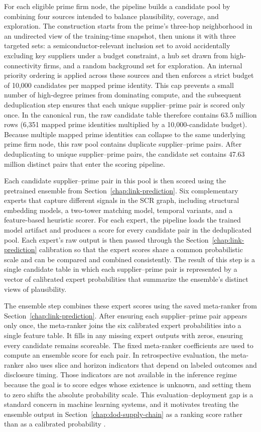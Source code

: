 For each eligible prime firm node, the pipeline builds a candidate pool by combining four sources intended to balance plausibility, coverage, and exploration. The construction starts from the prime's three-hop neighborhood in an undirected view of the training-time snapshot, then unions it with three targeted sets: a semiconductor-relevant inclusion set to avoid accidentally excluding key suppliers under a budget constraint, a hub set drawn from high-connectivity firms, and a random background set for exploration. An internal priority ordering is applied across these sources and then enforces a strict budget of 10{,}000 candidates per mapped prime identity. This cap prevents a small number of high-degree primes from dominating compute, and the subsequent deduplication step ensures that each unique supplier--prime pair is scored only once. In the canonical run, the raw candidate table therefore contains 63.5 million rows (6{,}351 mapped prime identities multiplied by a 10{,}000-candidate budget). Because multiple mapped prime identities can collapse to the same underlying prime firm node, this raw pool contains duplicate supplier--prime pairs. After deduplicating to unique supplier--prime pairs, the candidate set contains 47.63 million distinct pairs that enter the scoring pipeline.

Each candidate supplier--prime pair in this pool is then scored using the pretrained ensemble from Section~\ref{chap:link-prediction}. Six complementary experts that capture different signals in the SCR graph, including structural embedding models, a two-tower matching model, temporal variants, and a feature-based heuristic scorer. For each expert, the pipeline loads the trained model artifact and produces a score for every candidate pair in the deduplicated pool. Each expert's raw output is then passed through the Section~\ref{chap:link-prediction} calibration so that the expert scores share a common probabilistic scale and can be compared and combined consistently. The result of this step is a single candidate table in which each supplier--prime pair is represented by a vector of calibrated expert probabilities that summarize the ensemble's distinct views of plausibility.

The ensemble step combines these expert scores using the saved meta-ranker from Section~\ref{chap:link-prediction}. After ensuring each supplier--prime pair appears only once, the meta-ranker joins the six calibrated expert probabilities into a single feature table. It fills in any missing expert outputs with zeros, ensuring every candidate remains scoreable. The fixed meta-ranker coefficients are used to compute an ensemble score for each pair. In retrospective evaluation, the meta-ranker also uses slice and horizon indicators that depend on labeled outcomes and disclosure timing. Those indicators are not available in the inference regime because the goal is to score edges whose existence is unknown, and setting them to zero shifts the absolute probability scale. This evaluation--deployment gap is a standard concern in machine learning systems, and it motivates treating the ensemble output in Section~\ref{chap:dod-supply-chain} as a ranking score rather than as a calibrated probability \parencite{sculley_hidden_2015}.


